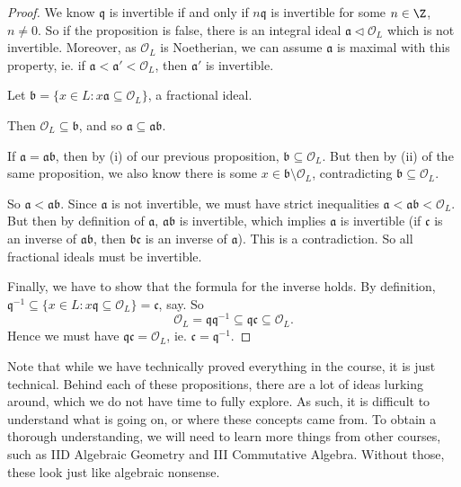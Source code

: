 \documentclass[a4paper]{article}
\begin{document}
\begin{proof}
  We know $\mathfrak{q}$ is invertible if and only if $n\mathfrak{q}$ is invertible for some $n \in \Z$, $n \not= 0$. So if the proposition is false, there is an integral ideal $\mathfrak{a} \lhd \mathcal{O}_L$ which is not invertible. Moreover, as $\mathcal{O}_L$ is Noetherian, we can assume $\mathfrak{a}$ is maximal with this property, ie. if $\mathfrak{a} < \mathfrak{a}' < \mathcal{O}_L$, then $\mathfrak{a}'$ is invertible.

  Let $\mathfrak{b} = \{x \in L: x \mathfrak{a} \subseteq \mathcal{O}_L\}$, a fractional ideal.

  Then $\mathcal{O}_L \subseteq \mathfrak{b}$, and so $\mathfrak{a} \subseteq \mathfrak{a} \mathfrak{b}$.

  If $\mathfrak{a} = \mathfrak{a}\mathfrak{b}$, then by (i) of our previous proposition, $\mathfrak{b} \subseteq \mathcal{O}_L$. But then by (ii) of the same proposition, we also know there is some $x \in \mathfrak{b} \setminus \mathcal{O}_L$, contradicting $\mathfrak{b} \subseteq \mathcal{O}_L$.

  So $\mathfrak{a} < \mathfrak{a} \mathfrak{b}$. Since $\mathfrak{a}$ is not invertible, we must have strict inequalities $\mathfrak{a} < \mathfrak{a}\mathfrak{b} < \mathcal{O}_L$. But then by definition of $\mathfrak{a}$, $\mathfrak{a}\mathfrak{b}$ is invertible, which implies $\mathfrak{a}$ is invertible (if $\mathfrak{c}$ is an inverse of $\mathfrak{a}\mathfrak{b}$, then $\mathfrak{b}\mathfrak{c}$ is an inverse of $\mathfrak{a}$). This is a contradiction. So all
  fractional ideals must be invertible.

  Finally, we have to show that the formula for the inverse holds. By definition, $\mathfrak{q}^{-1} \subseteq \{x \in L: x\mathfrak{q} \subseteq \mathcal{O}_L \} = \mathfrak{c}$, say. So
  \[
    \mathcal{O}_L = \mathfrak{q}\mathfrak{q}^{-1}\subseteq \mathfrak{q} \mathfrak{c} \subseteq \mathcal{O}_L.
  \]
  Hence we must have $\mathfrak{q}\mathfrak{c} = \mathcal{O}_L$, ie. $\mathfrak{c} = \mathfrak{q}^{-1}$.
\end{proof}
Note that while we have technically proved everything in the course, it is just technical. Behind each of these propositions, there are a lot of ideas lurking around, which we do not have time to fully explore. As such, it is difficult to understand what is going on, or where these concepts came from. To obtain a thorough understanding, we will need to learn more things from other courses, such as IID Algebraic Geometry and III Commutative Algebra. Without those, these look just like algebraic nonsense.
\end{document}
